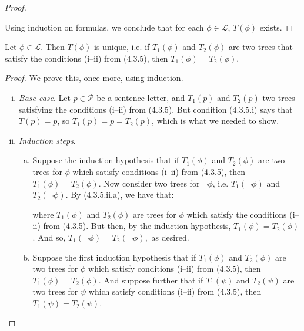 \begin{enumerate}[\thesection.1]
\begin{proof}
\begin{enumerate}[(i)]
			\end{enumerate}
			
		Using induction on formulas, we conclude that for each $\phi\in\mathcal{L}$, $T(\phi)$ exists.
		\end{proof}
	\begin{lemma}
	Let $\phi\in\mathcal{L}$. Then $T(\phi)$ is unique, i.e. if $T_1(\phi)$ and $T_2(\phi)$ are two trees that satisfy the conditions (i--ii) from (4.3.5), then $T_1(\phi)=T_2(\phi)$.
	\end{lemma}
	
	\begin{proof}
	We prove this, once more, using induction.
		
			\begin{enumerate}[(i)]
			
				\item \emph{Base case}. Let $p\in\mathcal{P}$ be a sentence letter, and $T_1(p)$ and $T_2(p)$ two trees satisfying the  conditions (i--ii) from (4.3.5). But condition (4.3.5.i) says that $T(p)=p$, so $T_1(p)=p=T_2(p)$, which is what we needed to show.
								
				\item \emph{Induction steps}.
				
					\begin{enumerate}[(a)]
					
					\item Suppose the induction hypothesis that if $T_1(\phi)$ and $T_2(\phi)$ are two trees for $\phi$ which satisfy  conditions (i--ii) from (4.3.5), then $T_1(\phi)=T_2(\phi)$. Now consider two trees for $\neg \phi$, i.e. $T_1(\neg\phi)$ and $T_2(\neg \phi)$. By (4.3.5.ii.a), we have that:	
			\begin{center}
\end{center}
where $T_1(\phi)$ and $T_2(\phi)$ are trees for $\phi$ which satisfy the conditions  (i--ii) from (4.3.5). But then, by the induction hypothesis, $T_1(\phi)=T_2(\phi)$. And so, $T_1(\neg\phi)=T_2(\neg \phi),$ as desired.

					
						\item Suppose the first induction hypothesis that if $T_1(\phi)$ and $T_2(\phi)$ are two trees for $\phi$ which satisfy  conditions (i--ii) from (4.3.5), then $T_1(\phi)=T_2(\phi)$. And suppose further that if $T_1(\psi)$ and $T_2(\psi)$ are two trees for $\psi$ which satisfy  conditions (i--ii) from (4.3.5), then $T_1(\psi)=T_2(\psi)$.
						

\end{enumerate}
\end{enumerate}
\end{proof}
\end{enumerate}
